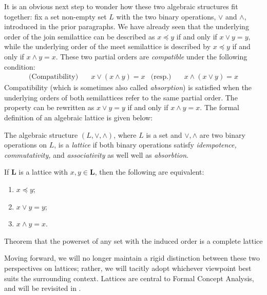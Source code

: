 It is an obvious next step to wonder how these two algebraic structures fit together: fix a set non-empty set $L$ with the two binary operations, $\vee$ and $\wedge$, introduced in the prior paragraphs. We have already seen that the underlying order of the join semilattice can be described as $x \preceq y$ if and only if $x \vee y = y$, while the underlying order of the meet semilattice is described by $x \preceq y$ if and only if $x \wedge y = x$. These two partial orders are \textit{compatible} under the following condition:
\begin{align}
     \text{(Compatibility)} & \quad x \vee (x \wedge y) = x & \text{(resp.)}  & \quad x \wedge (x \vee y) = x
\end{align}
%
Compatibility (which is sometimes also called \textit{absorption}) is satisfied when the underlying orders of both semilattices refer to the same partial order. The property can be rewritten as $x \vee y = y$ if and only if $x \wedge y = x$. The formal definition of an algebraic lattice is given below:

\begin{definition}
     \label{definition:algebraic-lattice}
The algebraic structure $(L, \vee, \wedge)$, where $L$ is a set and $\vee, \wedge$ are two binary operations on $L$, is a \emph{lattice} if both binary operations satisfy \textit{idempotence, commutativity,} and \textit{associativity} as well well as \textit{absorbtion}.
\end{definition}

\begin{lemma}
  \label{lemma:the-connecting-lemma}
  If $\mathbf{L}$ is a lattice with $x, y \in \mathbf{L}$, then the following are equivalent:
  \begin{enumerate}
      \setlength\itemsep{0pt}
      \setlength\parsep{0pt}
    \item $x \preceq y$;
    \item $x \vee y = y$;
    \item $x \wedge y = x$.
  \end{enumerate}
\end{lemma}

\begin{theorem}
\label{theorem:powerset-lattice}
	Theorem that the powerset of any set with the induced order is a complete lattice
\end{theorem}

Moving forward, we will no longer maintain a rigid distinction between these two perspectives on lattices; rather, we will tacitly adopt whichever viewpoint best suits the surrounding context. Lattices are central to Formal Concept Analysis, and will be revisited in .

